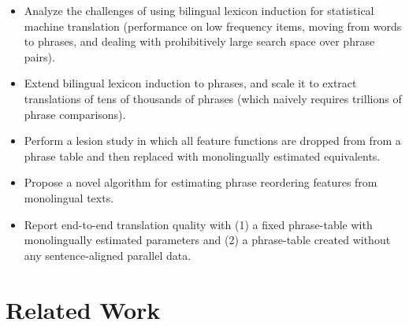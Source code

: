 \documentclass[11pt]{article}
\newcommand{\mnote}[1]{\marginpar{%
  \vskip-\baselineskip
  \raggedright\footnotesize
  \itshape\hrule\smallskip\tiny{#1}\par\smallskip\hrule}}
\newcommand{\mtodo}[1]{\mnote{\textcolor{red}{#1}}}
\newcommand{\secref}[1]{Section~\ref{#1}}
\begin{document}


\begin{itemize}
  \item Analyze the challenges of using bilingual lexicon induction for statistical machine translation (performance on low frequency items, moving from words to phrases, and dealing with prohibitively large search space over phrase pairs).
  \item Extend bilingual lexicon induction to phrases, and scale it to extract translations of tens of thousands of  phrases (which naively requires trillions of phrase comparisons). 
  \item Perform a lesion study in which all feature functions are dropped from from a phrase table and then replaced with monolingually estimated equivalents.
  \item Propose a novel algorithm for estimating phrase reordering features from monolingual texts.
  \item Report end-to-end translation quality with (1) a fixed phrase-table with monolingually estimated parameters and (2) a phrase-table created without any sentence-aligned parallel data.
\end{itemize}

\section{Related Work} \label{sect:related-work}
\end{document}
